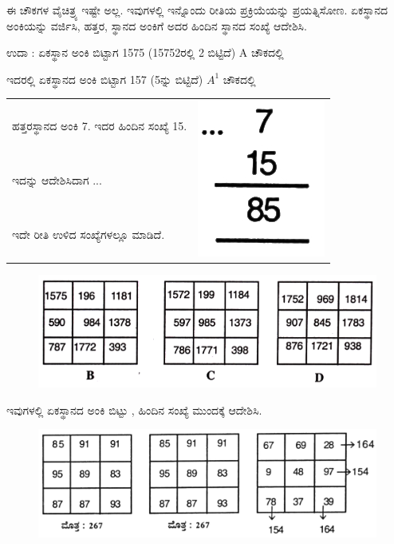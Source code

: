 ಈ ಚೌಕಗಳ ವೈಚಿತ್ರ್ಯ ಇಷ್ಟೇ ಅಲ್ಲ. ಇವುಗಳಲ್ಲಿ ಇನ್ನೊಂದು ರೀತಿಯ ಪ್ರಕ್ರಿಯೆಯನ್ನು ಪ್ರಯತ್ನಿಸೋಣ. ಏಕಸ್ಥಾನದ ಅಂಕಿಯನ್ನು ವರ್ಜಿಸಿ, ಹತ್ತರ, ಸ್ಥಾನದ ಅಂಕಿಗೆ ಅದರ ಹಿಂದಿನ ಸ್ಥಾನದ ಸಂಖ್ಯೆ ಆದೇಶಿಸಿ.

ಉದಾ : ಏಕಸ್ಥಾನ ಅಂಕಿ ಬಿಟ್ಟಾಗ 1575 (15752ರಲ್ಲಿ 2 ಬಿಟ್ಟಿದೆ) A ಚೌಕದಲ್ಲಿ

ಇದರಲ್ಲಿ ಏಕಸ್ಥಾನದ ಅಂಕಿ ಬಿಟ್ಟಾಗ 157 (5ನ್ನು ಬಿಟ್ಟಿದೆ) $A^1$ ಚೌಕದಲ್ಲಿ

\begin{tabular}{ll}
ಹತ್ತರಸ್ಥಾನದ ಅಂಕಿ 7. ಇದರ ಹಿಂದಿನ ಸಂಖ್ಯೆ 15. & \multirow{3}{2cm}{\includegraphics[scale=.8]{src/figures/chap7/fig7.33.jpg}}\\
ಇದನ್ನು ಆದೇಶಿಸಿದಾಗ ... & \\
ಇದೇ ರೀತಿ ಉಳಿದ ಸಂಖ್ಯೆಗಳಲ್ಲೂ ಮಾಡಿದೆ.
\end{tabular}

\begin{figure}[H]
\includegraphics{src/figures/chap7/fig7.13.jpg}
\end{figure}

ಇವುಗಳಲ್ಲಿ ಏಕಸ್ಥಾನದ ಅಂಕಿ ಬಿಟ್ಟು , ಹಿಂದಿನ ಸಂಖ್ಯೆ ಮುಂದಕ್ಕೆ ಆದೇಶಿಸಿ.
\begin{figure}[H]
\includegraphics{src/figures/chap7/fig7.14.jpg}
\end{figure}

